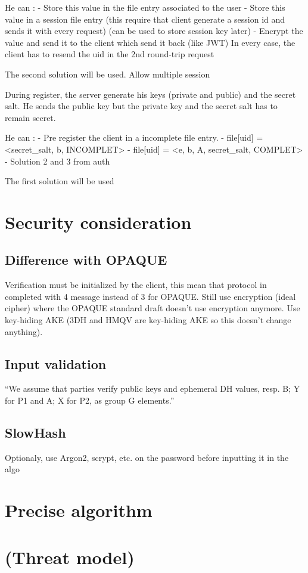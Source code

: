 \documentclass[../report.tex]{subfiles}
\begin{document}
He can :
- Store this value in the file entry associated to the user
- Store this value in a session file entry (this require that client generate a session id and sends it with every request) (can be used to store session key later)
- Encrypt the value and send it to the client which send it back (like JWT)
In every case, the client has to resend the uid in the 2nd round-trip request

The second solution will be used. Allow multiple session
 


During register, the server generate his keys (private and public) and the secret salt. He sends the public key but the private key and the secret salt has to remain secret.

He can :
- Pre register the client in a incomplete file entry.
   - file[uid] = <secret\_salt, b, INCOMPLET>
   - file[uid] = <e, b, A, secret\_salt, COMPLET>
- Solution 2 and 3 from auth

The first solution will be used




\section{Security consideration}

\subsection{Difference with OPAQUE} %

Verification must be initialized by the client, this mean that protocol in completed with 4 message instead of 3 for OPAQUE.
Still use encryption (ideal cipher) where the OPAQUE standard draft doesn't use encryption anymore.
Use key-hiding AKE (3DH and HMQV are key-hiding AKE so this doesn't change anything).

\subsection{Input validation}
``We assume that parties verify public keys and ephemeral DH values, resp.
B; Y for P1 and A; X for P2, as group G elements.''

\subsection{SlowHash}
Optionaly, use Argon2, scrypt, etc. on the password before inputting it in the algo


\section{Precise algorithm}

\section{(Threat model)}
\end{document}
